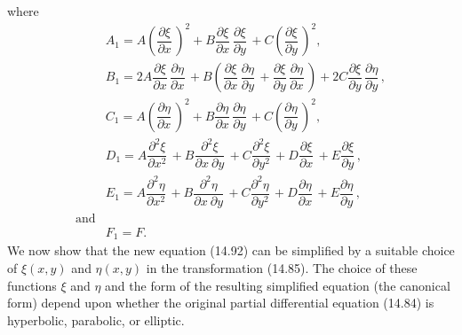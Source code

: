 \documentclass[11pt,a4paper, twoside]{report}
\newcommand{\pf}[2]{\dfrac{\partial #1}{\partial #2}\,}
\newcommand{\pfn}[3]{\dfrac{\partial^#3 #1}{\partial #2^#3}\,}
\newcommand{\pfp}[4]{\dfrac{\partial^#4 #1}{\partial #2\ \partial #3}\,}
\begin{document}
	where
	\begin{equation}\tag{14.93}
		\begin{aligned}
			& A_1 = A\left(\pf{\xi}{x}\right)^2 + B\pf{\xi}{x}\pf{\xi}{y} + C\left(\pf{\xi}{y}\right)^2,\\
			& B_1 = 2A \pf{\xi}{x}\pf{\eta}{x} + B \left(\pf{\xi}{x}\pf{\eta}{y} + \pf{\xi}{y}\pf{\eta}{x}\right) + 2C\pf{\xi}{y}\pf{\eta}{y},\\
			& C_1 = A\left(\pf{\eta}{x}\right)^2 + B\pf{\eta}{x}\pf{\eta}{y} + C\left(\pf{\eta}{y}\right)^2,\\
			& D_1 = A\pfn{\xi}{x}{2} + B\pfp{\xi}{x}{y}{2} + C\pfn{\xi}{y}{2} + D\pf{\xi}{x} + E\pf{\xi}{y},\\
			& E_1 = A\pfn{\eta}{x}{2} + B\pfp{\eta}{x}{y}{2} + C\pfn{\eta}{y}{2} + D\pf{\eta}{x} + E\pf{\eta}{y},\\
			\text{and}\\
			& F_1 = F.
		\end{aligned}
	\end{equation}
	We now show that the new equation (14.92) can be simplified by a suitable choice of $\xi(x, y)$ and $\eta(x, y)$ in the transformation (14.85). The choice of these functions $\xi$ and $\eta$ and the form of the resulting simplified equation (the canonical form) depend upon whether the original partial differential equation (14.84) is hyperbolic, parabolic, or elliptic.
\end{document}
